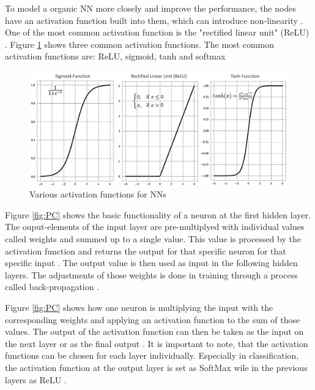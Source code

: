 To model a organic NN more closely and improve the performance, the nodes have an activation function built into them, which can introduce non-linearity \cite{Goyal}. One of the most common activation function is the "rectified linear unit" (ReLU) \cite{Goodfellow}. Figure \ref{fig:AF} shows three common activation functions. The most common activation functions are: ReLU, sigmoid, tanh and softmax \cite{Activation}

\begin{figure}[H]
	\centering
	\includegraphics[width=0.9\linewidth]{IMGs/Active.png}
	\caption{Various activation functions for NNs \cite{Activation}}
	\label{fig:AF}
\end{figure}

Figure \ref{fig:PC} shows the basic functionality of a neuron at the first hidden layer. The ouput-elements of the input layer are pre-multiplyed with individual values called weights and summed up to a single value. This value is processed by the activation function and returns the output for that specific neuron for that specific input \cite{BattaMahesh}. The output value is then used as input in the following hidden layers. The adjustments of those weights is done in training through a process called back-propagation \cite{Chauvin}. 

Figure \ref{fig:PC} shows how one neuron is multiplying the input with the corresponding weights and applying an activation function to the sum of those values. The output of the activation function can then be taken as the input on the next layer or as the final output \cite{Ding}.
It is important to note, that the activation functions can be chosen for each layer individually. Especially in classification, the activation function at the output layer is set as SoftMax wile in the previous layers as ReLU \cite{Asadi}. 

